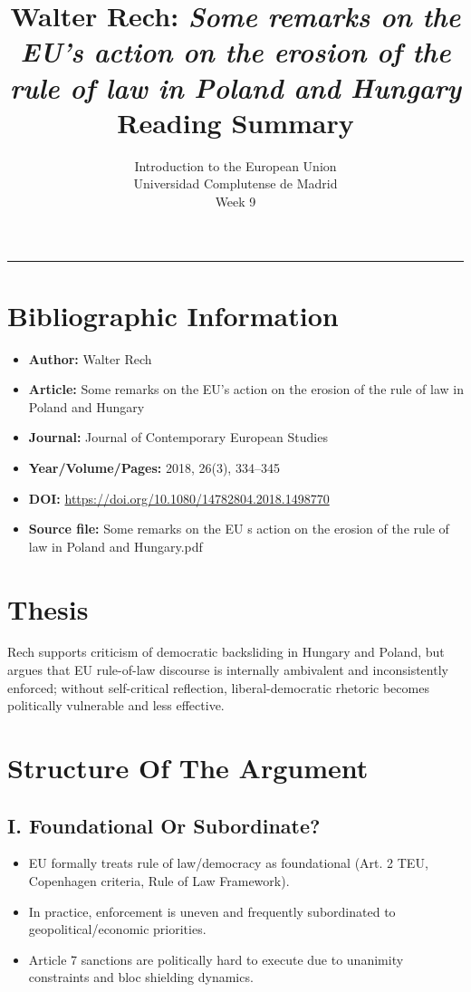\documentclass[11pt,a4paper]{article}
\begin{document}
\title{Walter Rech: \textit{Some remarks on the EU's action on the erosion of the rule of law in Poland and Hungary}\\Reading Summary}
\author{Introduction to the European Union\\Universidad Complutense de Madrid\\Week 9}
\date{}
\maketitle
\vspace{-1em}
\hrule
\vspace{1em}

\section*{Bibliographic Information}
\begin{itemize}
\item \textbf{Author:} Walter Rech
\item \textbf{Article:} Some remarks on the EU's action on the erosion of the rule of law in Poland and Hungary
\item \textbf{Journal:} Journal of Contemporary European Studies
\item \textbf{Year/Volume/Pages:} 2018, 26(3), 334--345
\item \textbf{DOI:} \url{https://doi.org/10.1080/14782804.2018.1498770}
\item \textbf{Source file:} Some remarks on the EU s action on the erosion of the rule of law in Poland and Hungary.pdf
\end{itemize}

\section*{Thesis}
Rech supports criticism of democratic backsliding in Hungary and Poland, but argues that EU rule-of-law discourse is internally ambivalent and inconsistently enforced; without self-critical reflection, liberal-democratic rhetoric becomes politically vulnerable and less effective.

\section*{Structure Of The Argument}
\subsection*{I. Foundational Or Subordinate?}
\begin{itemize}
\item EU formally treats rule of law/democracy as foundational (Art. 2 TEU, Copenhagen criteria, Rule of Law Framework).
\item In practice, enforcement is uneven and frequently subordinated to geopolitical/economic priorities.
\item Article 7 sanctions are politically hard to execute due to unanimity constraints and bloc shielding dynamics.
\end{itemize}
\end{document}
